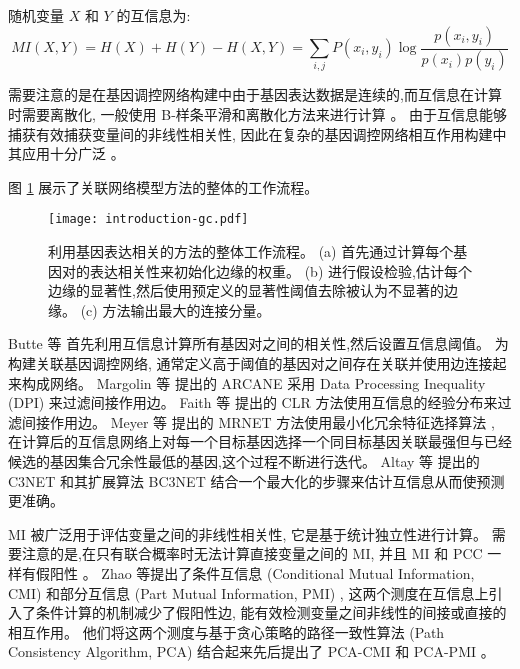 随机变量 $X$ 和 $Y$ 的互信息为:
\begin{equation}
    MI(X,Y) = H(X) + H(Y) - H(X,Y) = \sum\limits_{i,j} {P(x_i ,y_i )\log \frac{{p(x_i,y_i )}}{{p(x_i )p(y_i )}}} 
\end{equation}

需要注意的是在基因调控网络构建中由于基因表达数据是连续的,而互信息在计算时需要离散化,
一般使用 B-样条平滑和离散化方法来进行计算 \cite{daub2004estimating}。
由于互信息能够捕获有效捕获变量间的非线性相关性,
因此在复杂的基因调控网络相互作用构建中其应用十分广泛 \cite{brunel2010miss,zhang2011inferring}。

图 \ref{fig:pre-gc} 展示了关联网络模型方法的整体的工作流程。
\begin{figure}[!htbp]
    \centering
    \texttt{[image: introduction-gc.pdf]}
    \caption{
        利用基因表达相关的方法的整体工作流程。
        (a) 首先通过计算每个基因对的表达相关性来初始化边缘的权重。
        (b) 进行假设检验,估计每个边缘的显著性,然后使用预定义的显著性阈值去除被认为不显著的边缘。
        (c) 方法输出最大的连接分量。
    }
    \label{fig:pre-gc}
\end{figure}


Butte 等 \cite{basso2005reverse} 首先利用互信息计算所有基因对之间的相关性,然后设置互信息阈值。
为构建关联基因调控网络, 通常定义高于阈值的基因对之间存在关联并使用边连接起来构成网络。
Margolin 等 \cite{margolin2006aracne} 提出的 ARCANE 采用 Data Processing Inequality (DPI) 来过滤间接作用边。
Faith 等 \cite{faith2007large} 提出的 CLR 方法使用互信息的经验分布来过滤间接作用边。
Meyer 等 \cite{meyer2007information} 提出的 MRNET 方法使用最小化冗余特征选择算法 \cite{peng2005feature},
在计算后的互信息网络上对每一个目标基因选择一个同目标基因关联最强但与已经候选的基因集合冗余性最低的基因,这个过程不断进行迭代。
Altay 等 \cite{altay2010inferring} 提出的 C3NET 和其扩展算法 BC3NET \cite{de2012bagging} 结合一个最大化的步骤来估计互信息从而使预测更准确。

MI 被广泛用于评估变量之间的非线性相关性,
它是基于统计独立性进行计算。
需要注意的是,在只有联合概率时无法计算直接变量之间的 MI,
并且 MI 和 PCC 一样有假阳性 \cite{frenzel2007partial,schreiber2000measuring}。
Zhao 等提出了条件互信息 (Conditional Mutual Information, CMI) \cite{zhang2011inferring} 和部分互信息 (Part Mutual Information, PMI) \cite{zhao2016part},
这两个测度在互信息上引入了条件计算的机制减少了假阳性边,
能有效检测变量之间非线性的间接或直接的相互作用。
他们将这两个测度与基于贪心策略的路径一致性算法 (Path Consistency Algorithm, PCA) 结合起来先后提出了 PCA-CMI \cite{zhang2011inferring} 和 PCA-PMI \cite{zhao2016part}。

